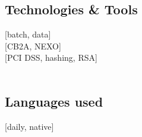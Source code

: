 {    \subsection{Technologies \& Tools}
     [batch, data] \\
    [CB2A, NEXO]\\
    [PCI DSS, hashing, RSA]\\
       \\
     
    
    \subsection{Languages used}
    [daily, native]
}
\makebody
\clearpage


